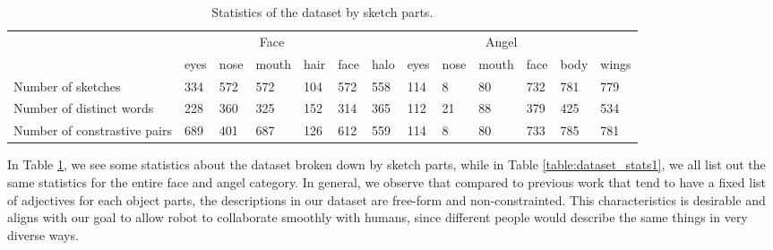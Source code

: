 \begin{table}[ht!]
\begin{minipage}{1\textwidth}
\begin{center}
{\small
\begin{tabular}{p{9em} | p{1.5em}p{1.5em}p{2em}p{1.5em}p{1.5em} | p{1.5em}p{1.5em}p{1.5em}p{2em}p{1.5em}p{1.5em}p{1.5em} }
\toprule
& \multicolumn{5}{c}{Face} & \multicolumn{7}{c}{Angel}\\
~ & eyes & nose & mouth & hair & face & halo & eyes & nose & mouth & face & body & wings  \\
\midrule
Number of sketches & 
334 & 572 & 572 & 104 & 572 &
558 & 114 & 8 & 80 & 732 & 781 & 779 \\
Number of distinct words & 
228 & 360 & 325 & 152 & 314 & 
365 & 112 & 21 & 88 & 379 & 425 & 534 \\
Number of constrastive pairs &
689 & 401 & 687 & 126 & 612 &
559 & 114 & 8 & 80 & 733 & 785 & 781 \\
\bottomrule
\end{tabular}}
\caption{Statistics of the dataset by sketch parts.}
\label{table:dataset_stats_byparts}
\end{center}
\end{minipage}
\end{table}

In Table \ref{table:dataset_stats_byparts}, we see some statistics about the dataset broken down by sketch parts, while in Table \ref{table:dataset_stats1}, we all list out the same statistics for the entire face and angel category. In general, we observe that compared to previous work that tend to have a fixed list of adjectives for each object parts, the descriptions in our dataset are free-form and non-constrainted. This characteristics is desirable and aligns with our goal to allow robot to collaborate smoothly with humans, since different people would describe the same things in very diverse ways. 